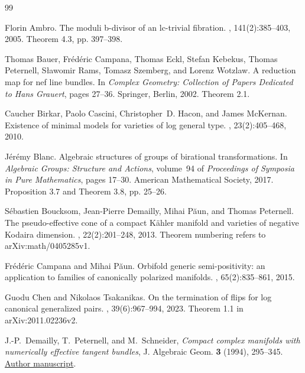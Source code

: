 \begin{thebibliography}{99}

Florin Ambro.
\newblock The moduli b-divisor of an lc-trivial fibration.
, 141(2):385--403, 2005.
\newblock Theorem 4.3, pp. 397--398.

Thomas Bauer, Fr{\'e}d{\'e}ric Campana, Thomas Eckl, Stefan Kebekus, Thomas Peternell, S{\l}awomir Rams, Tomasz Szemberg, and Lorenz Wotzlaw.
\newblock A reduction map for nef line bundles.
\newblock In {\em Complex Geometry: Collection of Papers Dedicated to {Hans Grauert}}, pages 27--36. Springer, Berlin, 2002.
\newblock Theorem 2.1.

Caucher Birkar, Paolo Cascini, Christopher~D. Hacon, and James McKernan.
\newblock Existence of minimal models for varieties of log general type.
, 23(2):405--468, 2010.

J{\'e}r{\'e}my Blanc.
\newblock Algebraic structures of groups of birational transformations.
\newblock In {\em Algebraic Groups: Structure and Actions}, volume~94 of {\em Proceedings of Symposia in Pure Mathematics}, pages 17--30. American Mathematical Society, 2017.
\newblock Proposition 3.7 and Theorem 3.8, pp. 25--26.

S{\'e}bastien Boucksom, Jean-Pierre Demailly, Mihai P{\u a}un, and Thomas Peternell.
\newblock The pseudo-effective cone of a compact {K{\"a}hler} manifold and varieties of negative {Kodaira} dimension.
, 22(2):201--248, 2013.
\newblock Theorem numbering refers to arXiv:math/0405285v1.

Fr{\'e}d{\'e}ric Campana and Mihai P{\u a}un.
\newblock Orbifold generic semi-positivity: an application to families of canonically polarized manifolds.
, 65(2):835--861, 2015.

Guodu Chen and Nikolaos Tsakanikas.
\newblock On the termination of flips for log canonical generalized pairs.
, 39(6):967--994, 2023.
\newblock Theorem 1.1 in arXiv:2011.02236v2.

J.-P.~Demailly, T.~Peternell, and M.~Schneider,
\emph{Compact complex manifolds with numerically effective tangent bundles},
J. Algebraic Geom. \textbf{3} (1994), 295--345.
\href{https://www-fourier.univ-grenoble-alpes.fr/~demailly/manuscripts/dps1.pdf}{Author manuscript}.


\end{thebibliography}
